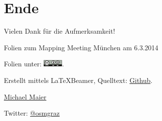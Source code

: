 \documentclass{beamer}
\begin{document}
%
%
%
%
%
%

%
%

\section{Ende}

\begin{frame}{Vielen Dank für die Aufmerksamkeit!}

  Folien zum Mapping Meeting München am 6.3.2014
\vspace{1cm}

Folien unter: \includegraphics[width=1cm]{cc-by-sa.pdf}.
\vspace{1cm}

Erstellt mittels \LaTeX Beamer, Quelltext: \href{https://github.com/species/vortrag-osm-mmm}{Github}.
\vspace{1cm}

\href{mailto:michael.maier@student.tugraz.at}{Michael Maier}

Twitter: \href{https://twitter.com/osmgraz}{@osmgraz}
\end{frame}
\end{document}
